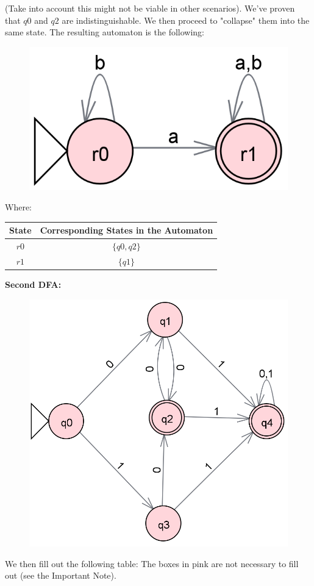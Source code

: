 \documentclass[12pt]{article}
\begin{document}
(Take into account this might not be viable in other scenarios). We've proven that $q0$ and $q2$ are indistinguishable. We then proceed to "collapse" them into the same state. The resulting automaton is the following:

\begin{figure}[h]
        \centering
        \includegraphics[width=0.4\linewidth]{First_Automaton_Fourth_Step.png}
\end{figure}

Where:

\begin{center}
\begin{tabular}{|c|c|}
    \hline
    State & Corresponding States in the Automaton \\
    \hline
    $r0$ & $\{q0,q2\}$ \\
    $r1$ & $\{q1\}$ \\
    \hline
\end{tabular}
\end{center}

\textbf{Second DFA:}

\begin{figure}[h]
    \centering
    \includegraphics[width=0.5\linewidth]{Second_Automaton.png}
\end{figure}

We then fill out the following table: The boxes in pink are not necessary to fill out (see the Important Note).
\end{document}
